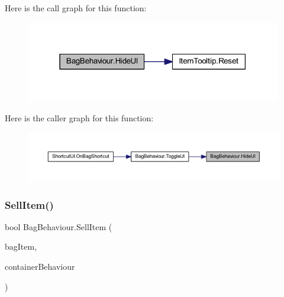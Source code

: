 Here is the call graph for this function\+:
\nopagebreak
\begin{figure}[H]
\begin{center}
\leavevmode
\includegraphics[width=315pt]{class_bag_behaviour_a731b060bd01b971246839664dfd86530_cgraph}
\end{center}
\end{figure}
Here is the caller graph for this function\+:
\nopagebreak
\begin{figure}[H]
\begin{center}
\leavevmode
\includegraphics[width=350pt]{class_bag_behaviour_a731b060bd01b971246839664dfd86530_icgraph}
\end{center}
\end{figure}
\mbox{\label{class_bag_behaviour_aa0aed3d648b13c1add4c2e2ce2ac9c38}} 
\subsubsection{\texorpdfstring{SellItem()}{SellItem()}}
{\footnotesize\ttfamily bool Bag\+Behaviour.\+Sell\+Item (\begin{DoxyParamCaption}\item[{\mbox{\hyperlink{class_bag_item_behaviour}{Bag\+Item\+Behaviour}}}]{bag\+Item,  }\item[{\mbox{\hyperlink{class_container_behaviour}{Container\+Behaviour}}}]{container\+Behaviour }\end{DoxyParamCaption})}


